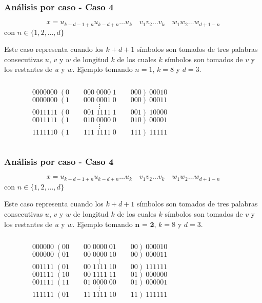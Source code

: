 \documentclass[10pt,mathserif]{beamer}%
\begin{document}
\begin{frame}
  \frametitle{Análisis por caso - Caso 4}
  $$ x = u_{k-d-1+n} u_{k-d+n} \dots u_k \quad v_1 v_2 \dots v_k \quad w_1 w_2 \dots w_{d+1-n} $$
  con $n \in \{1, 2, \dots , d\}$

  Este caso representa cuando los $k + d + 1$ símbolos son tomados de tres palabras consecutivas $u$, $v$ y $w$ de longitud $k$ de los cuales $k$ símbolos son tomados de $v$ y los restantes de $u$ y $w$.
  Ejemplo tomando $n = 1$, $k = 8$ y $d = 3$.
  \begin{columns}
    \begin{column}{0.5\textwidth}
      \begin{small}

        $$0000000\; (0 \qquad 000 \; 0000 \; 1 \qquad 000) \: 00010$$
        $$0000000\; (1 \qquad 000 \; 0001 \; 0 \qquad 000) \: 00011$$
        $$\vdots$$
        $$0011111\; (0 \qquad 001 \; 1111 \; 1 \qquad 001) \: 10000$$
        $$0011111\; (1 \qquad 010 \; 0000 \; 0 \qquad 010) \: 00001$$
        $$\vdots$$
        $$1111110\; (1 \qquad 111 \; 1111 \; 0 \qquad 111) \: 11111$$
      \end{small}
    \end{column}
    \begin{column}{0.5\textwidth}  %
    \end{column}
    \end{columns}
\end{frame}

\begin{frame}
  \frametitle{Análisis por caso - Caso 4}
  $$ x = u_{k-d-1+n} u_{k-d+n} \dots u_k \quad v_1 v_2 \dots v_k \quad w_1 w_2 \dots w_{d+1-n} $$
  con $n \in \{1, 2, \dots , d\}$

  Este caso representa cuando los $k + d + 1$ símbolos son tomados de tres palabras consecutivas $u$, $v$ y $w$ de longitud $k$ de los cuales $k$ símbolos son tomados de $v$ y los restantes de $u$ y $w$.
  Ejemplo tomando $\textbf{n = 2}$, $k = 8$ y $d = 3$.
  \begin{columns}
    \begin{column}{0.5\textwidth}
      \begin{small}

        $$000000\; (00 \qquad 00 \; 0000 \; 01 \qquad 00) \: 000010$$
$$000000\; (01 \qquad 00 \; 0000 \; 10 \qquad 00) \: 000011$$
$$\vdots$$
$$001111\; (01 \qquad 00 \; 1111 \; 10 \qquad 00) \: 111111$$
$$001111\; (10 \qquad 00 \; 1111 \; 11 \qquad 01) \: 000000$$
$$001111\; (11 \qquad 01 \; 0000 \; 00 \qquad 01) \: 000001$$
$$\vdots$$
$$111111\; (01 \qquad 11 \; 1111 \; 10 \qquad 11) \: 111111$$
      \end{small}
    \end{column}
    \begin{column}{0.5\textwidth}  %
    \end{column}
    \end{columns}
\end{frame}
\end{document}
